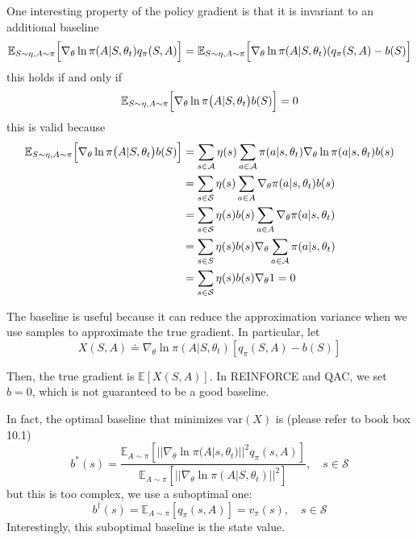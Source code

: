 \documentclass[10pt]{elegantbook}
\begin{document}
One interesting property of the policy gradient is that it is invariant to an additional
baseline
\begin{equation}
    \mathbb{E}_{S{\sim}\eta,A{\sim}\pi}\Bigl[\nabla_{\theta}\ln\pi(A|S,\theta_{t})q_{\pi}(S,A)\Bigr]=\mathbb{E}_{S{\sim}\eta,A{\sim}\pi}\Bigl[\nabla_{\theta}\ln\pi(A|S,\theta_{t})(q_{\pi}(S,A)-b(S)\Bigr]
\end{equation}
this holds if and only if
\[
    \mathbb{E}_{S\sim\eta,A\sim\pi}\Bigl[\nabla_{\theta}\ln\pi\bigl(A|S,\theta_{t}\bigr)b(S)\Bigr]=0
\]
this is valid because
\[
    \begin{aligned}
        \mathbb{E}_{S\sim\eta,A\sim\pi}\Bigl[\nabla_{\theta}\ln\pi\bigl(A|S,\theta_{t}\bigr)b(S)\Bigr]
        &= \sum_{s\in{\mathcal{A}}}\eta(s)\sum_{a\in{\mathcal{A}}}\pi(a|s,\theta_{t})\nabla_{\theta}\ln\pi(a|s,\theta_{t})b(s) \\
        &= \sum_{s\in{\cal S}}\eta(s)\sum_{a\in A}\nabla_{\theta}\pi(a|s,\theta_{t})b(s) \\
        &= \sum_{s\in{\mathcal{S}}}\eta(s)b(s)\sum_{a\in A}\nabla_{\theta}\pi(a|s,\theta_{t}) \\
        &= \sum_{s\in S}\eta(s)b(s)\nabla_{\theta}\sum_{a\in\mathcal{A}}\pi(a|s,\theta_{t}) \\
        &= \sum_{s\in{\mathcal{S}}}\eta(s)b(s)\nabla_{\theta}1=0
    \end{aligned}
\]

The baseline is useful because it can reduce the approximation variance when we use
samples to approximate the true gradient. In particular, let
\begin{equation}
    X(S,A) \doteq \nabla_{\theta}\ln\pi(A|S,\theta_{t})[q_{\pi}(S,A)-b(S)]
\end{equation}

Then, the true gradient is $\mathbb E [X(S,A)]$. In REINFORCE and QAC, we set $b = 0$, which is not guaranteed to be a good baseline.

In fact, the optimal baseline that minimizes $\text{var}(X)$ is (please refer to book box 10.1)
\begin{equation}
    b^{\ast}(s) = \frac{\mathbb{E}_{A\sim\pi}\left[||\nabla_{\theta}\ln\pi(A|s,\theta_{t})||^{2}q_{\pi}(s,A)\right]}
    {\mathbb{E}_{A \sim \pi}\left[||\nabla_{\theta}\ln\pi\left(A|S,\theta_{t}\right)||^{2}\right]}, \quad s \in \mathcal S
\end{equation}
but this is too complex, we use a suboptimal one:
\[
    b^{\dagger}(s)=\mathbb{E}_{A\sim\pi}[q_{\pi}(s,A)]=v_{\pi}(s),\quad s\in\mathcal{S}
\]
Interestingly, this suboptimal baseline is the state value.
\end{document}
